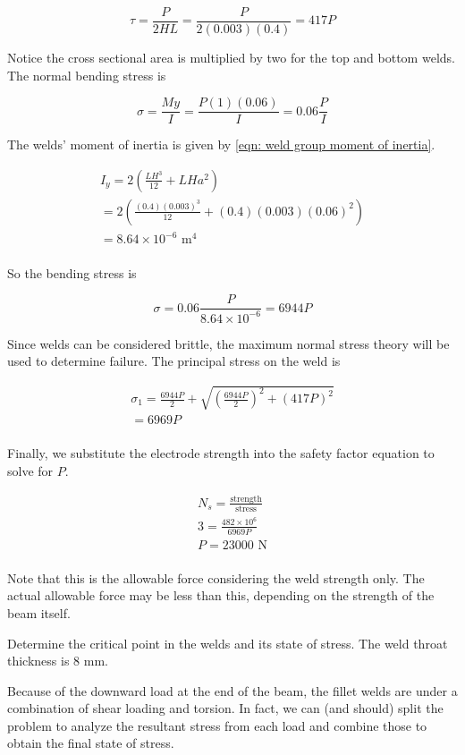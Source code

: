 \documentclass[a4paper,openany,nobib]{tufte-book}
\begin{document}
{{$$\tau  = \frac{P}{2HL} = \frac{P}{2(0.003)(0.4)} = 417P$$

Notice the cross sectional area is multiplied by two for the top and
bottom welds. The normal bending stress is

$$\sigma  = \frac{My}{I} = \frac{P(1)(0.06)}{I} = 0.06\frac{P}{I}$$

The welds' moment of inertia is given by
\ref{eqn: weld group moment of inertia}.

$$\begin{gathered}
      I_y = 2\left( \frac{LH^3}{12} + LHa^2 \right) \\ 
      = 2\left( \frac{(0.4)(0.003)^3}{12} + (0.4)(0.003)(0.06)^2 \right) \\ 
      = 8.64 \times 10^{-6} \text{ m}^4 \\ 
    \end{gathered}$$

So the bending stress is

$$\sigma  = 0.06\frac{P}{8.64 \times 10^{-6}} = 6944P$$

Since welds can be considered brittle, the maximum normal stress theory
will be used to determine failure. The principal stress on the weld is

$$\begin{gathered}
      \sigma _1 = \frac{6944P}{2} + \sqrt {\left( \frac{6944P}{2} \right)^2 + (417P)^2}  \\ 
      = 6969P \\ 
    \end{gathered}$$

Finally, we substitute the electrode strength into the safety factor
equation to solve for \(P\).

$$\begin{gathered}
      N_s = \frac{\text{strength}}{\text{stress}} \\ 
      3 = \frac{482 \times 10^6}{6969P} \\ 
      P = 23000 \text{ N} \\ 
    \end{gathered}$$

Note that this is the allowable force considering the weld strength
only. The actual allowable force may be less than this, depending on the
strength of the beam itself.

Determine the critical point in the welds and its state of stress. The
weld throat thickness is 8 mm.


Because of the downward load at the end of the beam, the fillet welds
are under a combination of shear loading and torsion. In fact, we can
(and should) split the problem to analyze the resultant stress from each
load and combine those to obtain the final state of stress.

}}
\end{document}
